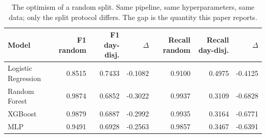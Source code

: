 \begin{table}[htbp]
\centering
\caption{The optimism of a random split. Same pipeline, same hyperparameters, same data; only the split protocol differs. The gap is the quantity this paper reports.}
\label{tab:gap}
\scriptsize
\begin{tabular}{lrrrrrr}
\hline
Model & F1 random & F1 day-disj. & $\Delta$ & Recall random & Recall day-disj. & $\Delta$ \\
\hline
Logistic Regression & 0.8515 & 0.7433 & -0.1082 & 0.9100 & 0.4975 & -0.4125 \\
Random Forest & 0.9874 & 0.6852 & -0.3022 & 0.9937 & 0.3109 & -0.6828 \\
XGBoost & 0.9879 & 0.6887 & -0.2992 & 0.9935 & 0.3164 & -0.6771 \\
MLP & 0.9491 & 0.6928 & -0.2563 & 0.9857 & 0.3467 & -0.6391 \\
\hline
\end{tabular}
\end{table}
